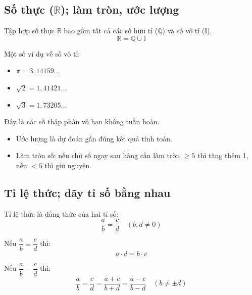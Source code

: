\documentclass[12pt,a4paper]{article}
\begin{document}
\subsection{Số thực ($\mathbb{R}$); làm tròn, ước lượng}

\begin{dinhnghia}
Tập hợp số thực $\mathbb{R}$ bao gồm tất cả các số hữu tỉ ($\mathbb{Q}$) và số vô tỉ ($\mathbb{I}$).
\[
  \mathbb{R} = \mathbb{Q} \cup \mathbb{I}
\]
\end{dinhnghia}

\begin{vidu}
Một số ví dụ về số vô tỉ:
\begin{itemize}
  \item $\pi = 3{,}14159\ldots$
  \item $\sqrt{2} = 1{,}41421\ldots$
  \item $\sqrt{3} = 1{,}73205\ldots$
\end{itemize}
Đây là các số thập phân vô hạn không tuần hoàn.
\end{vidu}

\begin{phuongphap}[title={Ước lượng và làm tròn}]
\begin{itemize}
  \item Ước lượng là dự đoán gần đúng kết quả tính toán.
  \item Làm tròn số: nếu chữ số ngay sau hàng cần làm tròn $\geq 5$ thì tăng thêm 1, nếu $< 5$ thì giữ nguyên.
\end{itemize}
\end{phuongphap}

\subsection{Tỉ lệ thức; dãy tỉ số bằng nhau}

\begin{dinhnghia}
Tỉ lệ thức là đẳng thức của hai tỉ số:
\[
  \frac{a}{b} = \frac{c}{d} \quad (b, d \neq 0)
\]
\end{dinhnghia}

\begin{tinhchat}[title={Tính chất cơ bản của tỉ lệ thức}]
Nếu $\dfrac{a}{b} = \dfrac{c}{d}$ thì:
\[
  a \cdot d = b \cdot c
\]
\end{tinhchat}

\begin{tinhchat}[title={Tính chất dãy tỉ số bằng nhau}]
Nếu $\dfrac{a}{b} = \dfrac{c}{d}$ thì:
\[
  \frac{a}{b} = \frac{c}{d} = \frac{a + c}{b + d} = \frac{a - c}{b - d} \quad (b \neq \pm d)
\]
\end{tinhchat}
\end{document}
